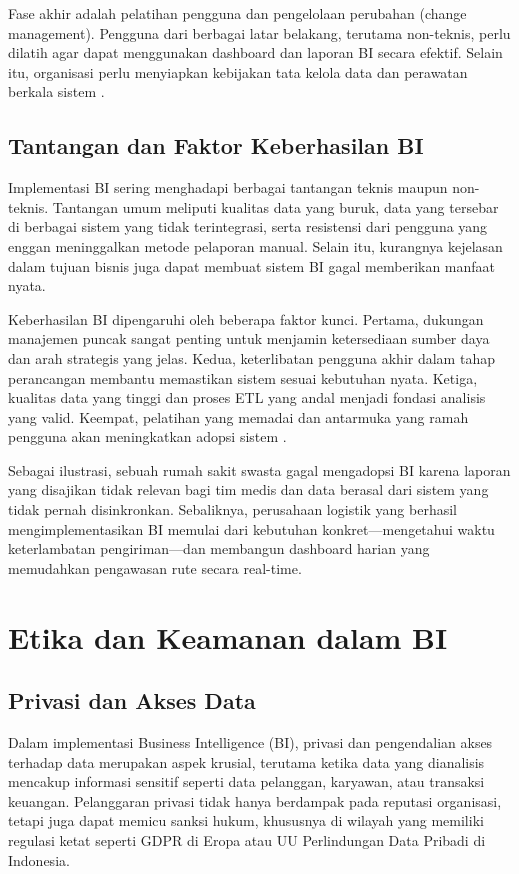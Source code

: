 Fase akhir adalah pelatihan pengguna dan pengelolaan perubahan (change management). Pengguna dari berbagai latar belakang, terutama non-teknis, perlu dilatih agar dapat menggunakan dashboard dan laporan BI secara efektif. Selain itu, organisasi perlu menyiapkan kebijakan tata kelola data dan perawatan berkala sistem \cite{yeoh2008biimplement}.

\subsection{Tantangan dan Faktor Keberhasilan BI}

Implementasi BI sering menghadapi berbagai tantangan teknis maupun non-teknis. Tantangan umum meliputi kualitas data yang buruk, data yang tersebar di berbagai sistem yang tidak terintegrasi, serta resistensi dari pengguna yang enggan meninggalkan metode pelaporan manual. Selain itu, kurangnya kejelasan dalam tujuan bisnis juga dapat membuat sistem BI gagal memberikan manfaat nyata.

Keberhasilan BI dipengaruhi oleh beberapa faktor kunci. Pertama, dukungan manajemen puncak sangat penting untuk menjamin ketersediaan sumber daya dan arah strategis yang jelas. Kedua, keterlibatan pengguna akhir dalam tahap perancangan membantu memastikan sistem sesuai kebutuhan nyata. Ketiga, kualitas data yang tinggi dan proses ETL yang andal menjadi fondasi analisis yang valid. Keempat, pelatihan yang memadai dan antarmuka yang ramah pengguna akan meningkatkan adopsi sistem \cite{islam2017success}.

Sebagai ilustrasi, sebuah rumah sakit swasta gagal mengadopsi BI karena laporan yang disajikan tidak relevan bagi tim medis dan data berasal dari sistem yang tidak pernah disinkronkan. Sebaliknya, perusahaan logistik yang berhasil mengimplementasikan BI memulai dari kebutuhan konkret—mengetahui waktu keterlambatan pengiriman—dan membangun dashboard harian yang memudahkan pengawasan rute secara real-time.



\section{Etika dan Keamanan dalam BI}
\subsection{Privasi dan Akses Data}

Dalam implementasi Business Intelligence (BI), privasi dan pengendalian akses terhadap data merupakan aspek krusial, terutama ketika data yang dianalisis mencakup informasi sensitif seperti data pelanggan, karyawan, atau transaksi keuangan. Pelanggaran privasi tidak hanya berdampak pada reputasi organisasi, tetapi juga dapat memicu sanksi hukum, khususnya di wilayah yang memiliki regulasi ketat seperti GDPR di Eropa atau UU Perlindungan Data Pribadi di Indonesia.

